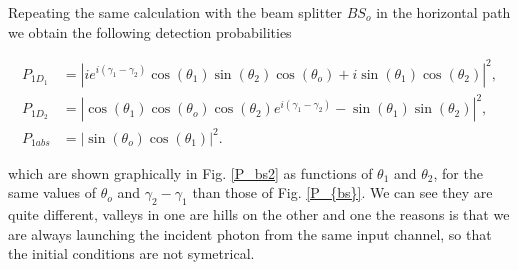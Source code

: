 \documentclass{book}
\begin{document}



Repeating the same calculation with the beam splitter $BS_{o}$ in the horizontal path we obtain the following detection probabilities



\begin{align}
P_{1D_{1}}&=|ie^{i(\gamma_{1}-\gamma_{2})}\cos(\theta_{1})\sin(\theta_{2})\cos(\theta_{o})+i \sin(\theta_{1})\cos(\theta_{2})|^2, \\
P_{1D_{2}}&=|\cos(\theta_{1})\cos(\theta_{o})\cos(\theta_{2})e^{i(\gamma_{1}-\gamma_{2})}- \sin(\theta_{1})\sin(\theta_{2})|^2,\\
P_{1abs}&=|\sin(\theta_{o}) \cos(\theta_{1})|^2 .
\end{align}

which are shown graphically in Fig. \ref{P_bs2} as functions of $\theta_{1}$ and $\theta_{2}$, for the same values of $\theta_{o}$ and $\gamma_{2}-\gamma_{1}$ than those of Fig. \ref{P_{bs}}. We can see they are quite different, valleys in one are hills on the other and one the reasons is that we are always launching the incident photon from the same input channel, so that the initial conditions are not symetrical.
\end{document}
